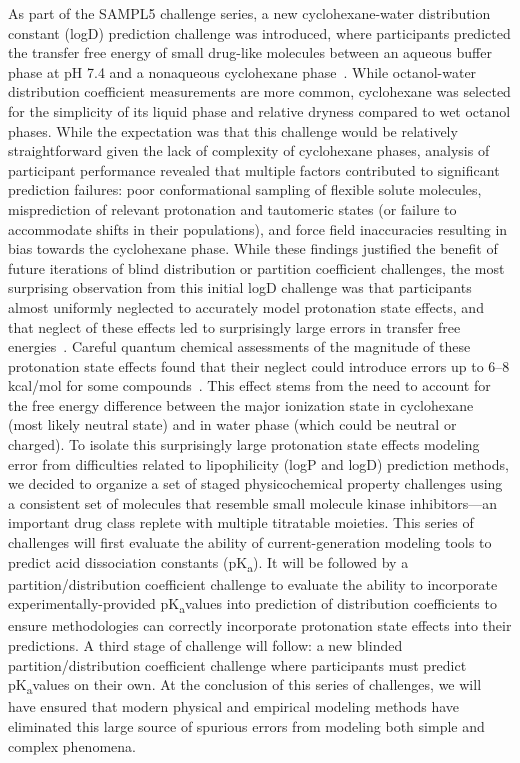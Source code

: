 \documentclass[9pt,lineno]{elife}
\newcommand{\pKa}{pK\textsubscript{a}}
\begin{document}
As part of the SAMPL5 challenge series, a new cyclohexane-water distribution constant (logD) prediction challenge was introduced, where participants predicted the transfer free energy of small drug-like molecules between an aqueous buffer phase at pH 7.4 and a nonaqueous cyclohexane phase~\citep{bannan_blind_2016,rustenburg_measuring_2016}. 
While octanol-water distribution coefficient measurements are more common, cyclohexane was selected for the simplicity of its liquid phase and relative dryness compared to wet octanol phases.
While the expectation was that this challenge would be relatively straightforward given the lack of complexity of cyclohexane phases, analysis of participant performance revealed that multiple factors contributed to significant prediction failures: poor conformational sampling of flexible solute molecules, misprediction of relevant protonation and tautomeric states (or failure to accommodate shifts in their populations), and force field inaccuracies resulting in bias towards the cyclohexane phase.
While these findings justified the benefit of future iterations of blind distribution or partition coefficient challenges, the most surprising observation from this initial logD challenge was that participants almost uniformly neglected to accurately model protonation state effects, and that neglect of these effects led to surprisingly large errors in transfer free energies~\citep{bannan_blind_2016, pickard_blind_2016,rustenburg_measuring_2016}. 
Careful quantum chemical assessments of the magnitude of these protonation state effects found that their neglect could introduce errors up to 6--8 kcal/mol for some compounds~\citep{pickard_blind_2016}. This effect stems from the need to account for the free energy difference between the major ionization state in cyclohexane (most likely neutral state) and in water phase (which could be neutral or charged). 
To isolate this surprisingly large protonation state effects modeling error from difficulties related to lipophilicity (logP and logD) prediction methods, we decided to organize a set of staged physicochemical property challenges using a consistent set of molecules that resemble small molecule kinase inhibitors---an important drug class replete with multiple titratable moieties.
This series of challenges will first evaluate the ability of current-generation modeling tools to predict acid dissociation constants (\pKa). It will be followed by a partition/distribution coefficient challenge to evaluate the ability to incorporate experimentally-provided \pKa values into prediction of distribution coefficients to ensure methodologies can correctly incorporate protonation state effects into their predictions. A third stage of challenge will follow: a new blinded partition/distribution coefficient challenge where participants must predict \pKa values on their own.
At the conclusion of this series of challenges, we will have ensured that modern physical and empirical modeling methods have eliminated this large source of spurious errors from modeling both simple and complex phenomena.
\end{document}

